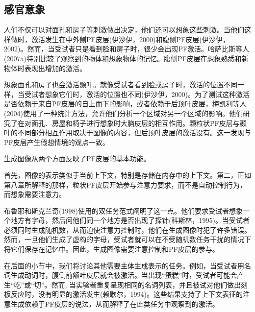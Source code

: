 \subsection{感官意象}
\par
人们不仅可以对面孔和房子等刺激做出决定，他们还可以想象这些刺激。当他们这样做时，激活发生在中外侧PF皮层(伊沙伊，2000)和腹侧PF皮层(伊沙伊，2002)。然而，当受试者只是看到脸和房子时，很少会出现PF激活。哈萨比斯等人(2007a)特别比较了观察到的物体和想象物体的记忆。腹侧PF皮层在想象熟悉和新物体时表现出增加的激活。
\par
想象面孔和房子也会激活颞叶。就像受试者看到脸或房子时，激活的位置不同一样，当受试者想象它们时，激活的位置也不同(伊沙伊，2000)。为了测试这种激活是否依赖于来自PF皮层的自上而下的影响，或者依赖于后顶叶皮层，梅凯利等人(2004)使用了一种统计方法，允许他们分析一个区域对另一个区域的影响。他们研究了在对面孔、房屋和椅子进行想象时大脑皮层的相互作用。颗粒状PF皮层与颞叶的不同部分相互作用取决于图像的内容，但后顶叶皮层的激活没有。这一发现与PF皮层产生假想情境的观点一致。
\par
生成图像从两个方面反映了PF皮层的基本功能。
\par
首先，图像的表示类似于当前上下文，特别是存储在内存中的上下文。第二，正如第八章所解释的那样，粒状PF皮层开始参与注意力要求，而不是自动控制行为，而想象需要注意力。
\par
布鲁耶和斯克兰奇(1998)使用的双任务范式阐明了这一点。他们要求受试者想象一个地方有字母，然后问他们同一个地方是否出现了探针(科斯林，1995)。当受试者必须同时生成随机数，从而迫使注意力控制时，他们在生成图像时犯了许多错误。然而，一旦他们生成了虚构的字母，受试者就可以在不受随机数任务干扰的情况下将它们保存在记忆中。因此，生成图像需要注意控制和PF皮层的参与。
\par
在后面的小节中，我们将讨论其他需要主体生成表示的任务。例如，当受试者用名词生成动词时，腹侧前额叶皮层就会被激活。当出现“蛋糕”时，受试者可能会产生“吃”或“切”。然而, 当实验者重复呈现相同的名词列表，并且被试对他们做出刻板反应时，没有明显的激活发生(赖歇尔，1994)。这些结果支持了上下文表征的注意生成依赖于PF皮层的说法，从而解释了在此类任务中观察到的激活。
